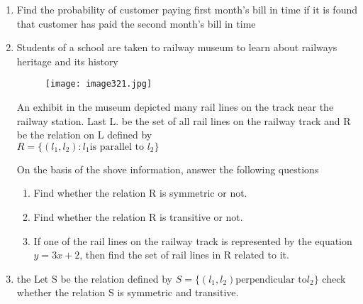 \documentclass{article}
\begin{document}
\begin{enumerate}
\item Find the probability of customer paying first month's bill in time if it is found that customer has paid the second month's bill in time

\item Students of a school are taken to railway museum to learn about railways heritage and its history
\newpage
\begin{figure}[h!] 
\centering  
\texttt{[image: image321.jpg]} 
\caption{}
\label{fig:image321}                      
\end{figure}

An exhibit in the museum depicted many rail lines on the track near the railway station. Last L. be the set of all rail lines on the railway track and R be the relation on L defined by\\
$R = \{(l_1, l_2):l_1 \text{is parallel to }l_2\}$

On the basis of the shove information, answer the following questions
\begin{enumerate}
\item Find whether the relation R is symmetric or not.
\item Find whether the relation R is transitive or not.
\item If one of the rail lines on the railway track is represented by the equation $y=3x+ 2$, then find the set of rail lines in R related to it.
\end{enumerate}
\item the Let S be the relation defined by $ S = \{(l_1,l_2)\text{perpendicular to} l_2\}$ check whether the relation S is symmetric and transitive.
\end{enumerate}
\end{document}
